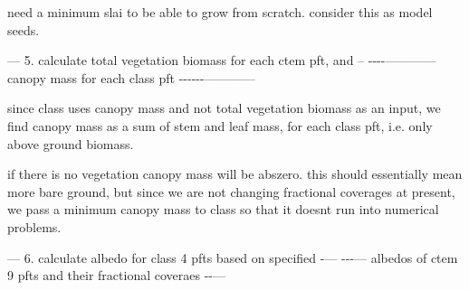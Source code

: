 need a minimum slai to be able to grow from scratch. consider this as model seeds.

--- 5. calculate total vegetation biomass for each ctem pft, and -- -\/-\/-\/-\/------------ canopy mass for each class pft -\/-\/-\/-\/-\/-\/------------

since class uses canopy mass and not total vegetation biomass as an input, we find canopy mass as a sum of stem and leaf mass, for each class pft, i.\+e. only above ground biomass.

if there is no vegetation canopy mass will be abszero. this should essentially mean more bare ground, but since we are not changing fractional coverages at present, we pass a minimum canopy mass to class so that it doesn\textquotesingle{}t run into numerical problems.

--- 6. calculate albedo for class\textquotesingle{} 4 pfts based on specified -\/--- -\/-\/-\/--- albedos of ctem 9 pfts and their fractional coveraes -\/-\/---